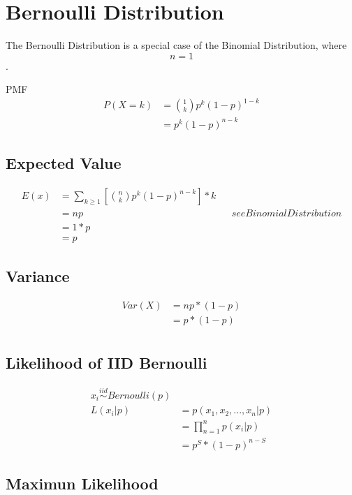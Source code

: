 \documentclass[]{article}
\begin{document}
\section {Bernoulli Distribution}

The Bernoulli Distribution is a special case of the Binomial Distribution, where $$n=1$$.

PMF
\begin{align}
P(X=k) &= \binom{1} {k} p^k (1-p)^{1-k}\\
&=p^k (1-p)^{n-k}
\end{align}

\subsection {Expected Value}
\begin{align}
	E(x) &= \sum_{k \geqslant 1} [\binom{n}{k} p^k (1-p)^{n-k}] * k\\
	&= np && see BinomialDistribution\\
	&= 1*p\\
	&= p
\end{align}

\subsection {Variance}
\begin{align}
	Var(X) &= np*(1-p)\\
	&= p*(1-p)\\
\end{align}

\subsection {Likelihood of IID Bernoulli}

\begin{align}
	x_i \overset{iid}{\sim} Bernoulli(p)\\
	L(x_i|p)&=p(x_1,x_2,...,x_n|p)\\&=\prod_{n=1}^np(x_i|p)\\
	&=p^S*(1-p)^{n-S}
 \end{align}
 
\subsection {Maximun Likelihood}
 
\end{document}
